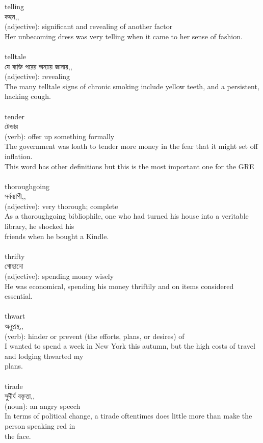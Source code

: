 \documentclass{article}
\begin{document}
{telling}\\
{কহন,,}\\
{(adjective): significant and revealing of another factor\\Her unbecoming dress was very telling when it came to her sense of fashion.\\}\\
{telltale}\\
{যে ব্যক্তি পরের অন্যায় জানায়,,}\\
{(adjective): revealing\\The many telltale signs of chronic smoking include yellow teeth, and a persistent, hacking cough.\\}\\
{tender}\\
{টেন্ডার}\\
{(verb): offer up something formally\\The government was loath to tender more money in the fear that it might set off inflation.\\This word has other definitions but this is the most important one for the GRE\\}\\
{thoroughgoing}\\
{সর্বব্যাপী,,}\\
{(adjective): very thorough; complete\\As a thoroughgoing bibliophile, one who had turned his house into a veritable library, he shocked his\\friends when he bought a Kindle.\\}\\
{thrifty}\\
{গোছানো}\\
{(adjective): spending money wisely\\He was economical, spending his money thriftily and on items considered essential.\\}\\
{thwart}\\
{অনুপ্রস্থ,,}\\
{(verb): hinder or prevent (the efforts, plans, or desires) of\\I wanted to spend a week in New York this autumn, but the high costs of travel and lodging thwarted my\\plans.\\}\\
{tirade}\\
{সুদীর্ঘ বক্তৃতা,,}\\
{(noun): an angry speech\\In terms of political change, a tirade oftentimes does little more than make the person speaking red in\\the face.\\}\\
\end{document}
